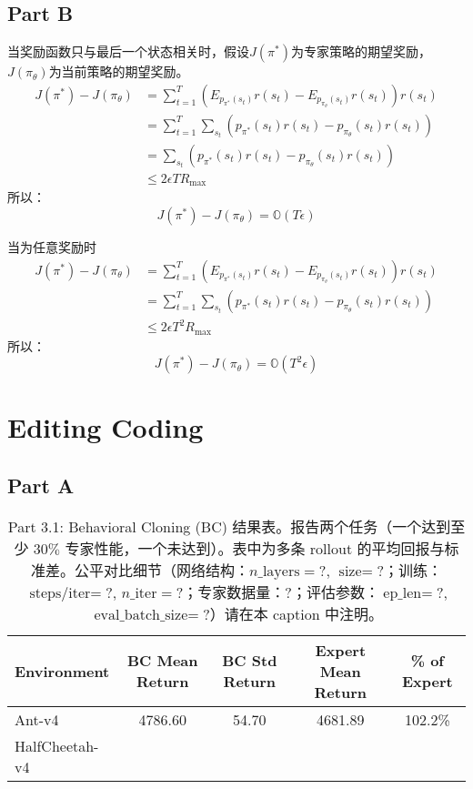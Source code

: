 \documentclass[12pt,oneside]{book}
\begin{document}
\subsection{Part B}
当奖励函数只与最后一个状态相关时，假设$J(\pi^*)$为专家策略的期望奖励，$J(\pi_{\theta})$为当前策略的期望奖励。
\begin{align}
    {J}(\pi^*) - {J}(\pi_{\theta}) 
    &= \sum_{t=1}^{T} (E_{p_{\pi^*}(s_t)}r(s_t) - E_{p_{\pi_{\theta}}(s_t)}r(s_t)) r(s_t)\nonumber \\
    &= \sum_{t=1}^{T} \sum_{s_t} (p_{\pi^*}(s_t)r(s_t) - p_{\pi_{\theta}}(s_t)r(s_t)) \nonumber \\
    &= \sum_{s_t} (p_{\pi^*}(s_t)r(s_t) - p_{\pi_{\theta}}(s_t)r(s_t)) \nonumber \\
    &\leq 2\epsilon T R_{\max}
\end{align}
所以：
\begin{equation}
    {J}(\pi^*) - {J}(\pi_{\theta}) = \mathbb{O}(T \epsilon)
\end{equation}

当为任意奖励时
\begin{align}
    {J}(\pi^*) - {J}(\pi_{\theta}) 
    &= \sum_{t=1}^{T} (E_{p_{\pi^*}(s_t)}r(s_t) - E_{p_{\pi_{\theta}}(s_t)}r(s_t)) r(s_t)\nonumber \\
    &= \sum_{t=1}^{T} \sum_{s_t} (p_{\pi^*}(s_t)r(s_t) - p_{\pi_{\theta}}(s_t)r(s_t)) \nonumber \\
    &\leq 2\epsilon T^2 R_{\max}
\end{align}
所以：
\begin{equation}
    {J}(\pi^*) - {J}(\pi_{\theta}) = \mathbb{O}(T^2 \epsilon)
\end{equation}

\section{Editing Coding}

\subsection{Part A}
\begin{table}[h!]
    \centering
    \caption{Part 3.1: Behavioral Cloning (BC) 结果表。报告两个任务（一个达到至少 \(30\%\) 专家性能，一个未达到）。表中为多条 rollout 的平均回报与标准差。公平对比细节（网络结构：\(n\_\text{layers}=\)?, \(\text{size}=\)?；训练：\(\text{steps/iter}=\)?, \(n\_\text{iter}=\)?；专家数据量：?；评估参数：\(\text{ep\_len}=\)?, \(\text{eval\_batch\_size}=\)?）请在本 caption 中注明。}
    \label{tab:bc_part3_1}
    \vspace{0.5em}
    \begin{tabular}{lcccc}
    \hline
    Environment & BC Mean Return & BC Std Return & Expert Mean Return & \% of Expert \\
    \hline
    Ant-v4 & 4786.60 & 54.70 & 4681.89 & 102.2\% \\
    HalfCheetah-v4 &  &  &  &  \\
    \hline
    \end{tabular}
\end{table}
    
\end{document}
